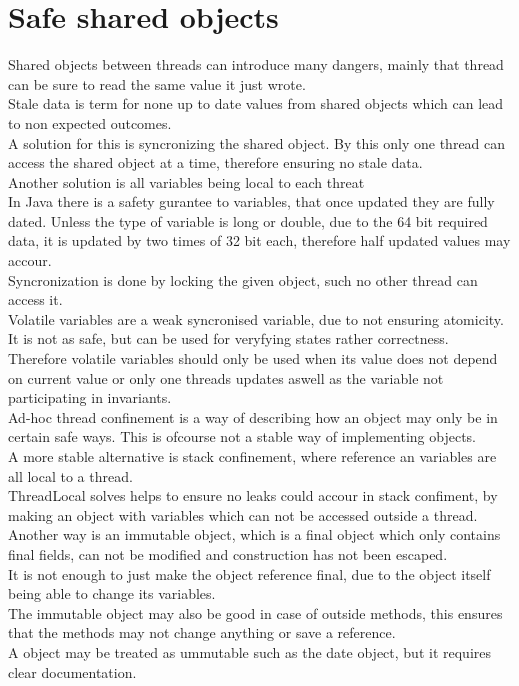 \documentclass[12pt, a4paper]{article}
\begin{document}
	\section{Safe shared objects}
		Shared objects between threads can introduce many dangers, mainly that thread can be sure to read the same value it just wrote.\\
		Stale data is term for none up to date values from shared objects which can lead to non expected outcomes.\\
		A solution for this is syncronizing the shared object. By this only one thread can access the shared object at a time, therefore ensuring no stale data.\\
		Another solution is all variables being local to each threat\\[4mm]
		In Java there is a safety gurantee to variables, that once updated they are fully dated. Unless the type of variable is long or double, due to the 64 bit required data, it is updated by two times of 32 bit each, therefore half updated values may accour.\\
		Syncronization is done by locking the given object, such no other thread can access it. \\[4mm]
		Volatile variables are a weak syncronised variable, due to not ensuring atomicity. It is not as safe, but can be used for veryfying states rather correctness.\\
		Therefore volatile variables should only be used when its value does not depend on current value or only one threads updates aswell as the variable not participating in invariants.\\[4mm]
		Ad-hoc thread confinement is a way of describing how an object may only be in certain safe ways. This is ofcourse not a stable way of implementing objects.\\
		A more stable alternative is stack confinement, where reference an variables are all local to a thread.\\
		ThreadLocal solves helps to ensure no leaks could accour in stack confiment, by making an object with variables which can not be accessed outside a thread.\\
		Another way is an immutable object, which is a final object which only contains final fields, can not be modified and construction has not been escaped.\\
		It is not enough to just make the object reference final, due to the object itself being able to change its variables.\\
		The immutable object may also be good in case of outside methods, this ensures that the methods may not change anything or save a reference.\\
		A object may be treated as ummutable such as the date object, but it requires clear documentation.\\
		
\end{document}
